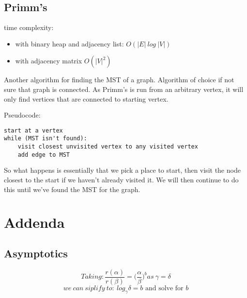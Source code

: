 \documentclass[12pt, letterpaper]{article}
\begin{document}
\subsection{Primm's}
time complexity: 
\begin{itemize}
\item with binary heap and adjacency list: $O (|E|\ log\ |V|)$
\item with adjacency matrix $O (|V|^2)$
\end{itemize}


Another algorithm for finding the MST of a graph. Algorithm of choice if not sure that graph is connected. As Primm's is run from an arbitrary vertex, it will only find vertices that are connected to starting vertex. 

Pseudocode:
\begin{verbatim}
start at a vertex
while (MST isn't found):
    visit closest unvisited vertex to any visited vertex
    add edge to MST
\end{verbatim}
So what happens is essentially that we pick a place to start, then visit the node closest to the start if we haven't already visited it. We will then continue to do this until we've found the MST for the graph.
\section{Addenda}
\subsection{Asymptotics}

\begin{equation}
Taking:
\frac{r(\alpha)}{r(\beta)} = \bigg(\frac{\alpha}{\beta}\bigg)^b as\ \gamma = \delta
\end{equation}
\begin{equation}
we\ can\ siplify\ to:\ log_\gamma \delta = b \textrm{ and solve for $b$}
\end{equation}
\end{document}
